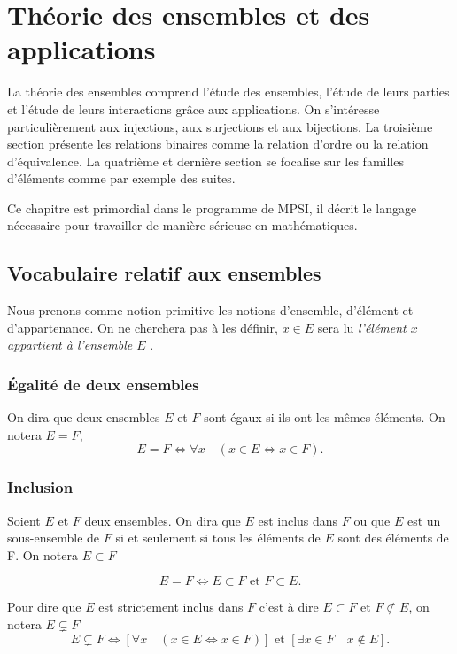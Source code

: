 \chapter{Théorie des ensembles et des applications}
\label{chap:ensembles}
\minitoc
\minilof
\minilot

La théorie des ensembles comprend l'étude des ensembles, l'étude de leurs parties et l'étude de leurs interactions grâce aux applications. On s'intéresse particulièrement aux injections, aux surjections et aux bijections. La troisième section présente les relations binaires comme la relation d'ordre ou la relation d'équivalence. La quatrième et dernière section se focalise sur les familles d'éléments comme par exemple des suites. 

Ce chapitre est primordial dans le programme de MPSI, il décrit le langage nécessaire pour travailler de manière sérieuse en mathématiques.
%
\section{Vocabulaire relatif aux ensembles}
\label{chap3-sec:vocabensemble}
Nous prenons comme notion primitive les notions d'ensemble, d'élément et d'appartenance. On ne cherchera pas à les définir, \og$x \in E$\fg{} sera lu \og \emph{l'élément $x$ appartient à l'ensemble $E$} \fg{}.
%
\subsection{Égalité de deux ensembles}
\label{chap3-subsec:egalitededeuxensembles}
\begin{defdef}
  On dira que deux ensembles $E$ et $F$ sont égaux si ils ont les mêmes éléments. On notera $E=F$,
  \begin{equation}
    E=F \iff \forall x \quad \left(x \in E \iff x \in F \right).
  \end{equation}
\end{defdef}
%
\subsection{Inclusion}
\label{chap3-subsec:inclusion}
\begin{defdef}
  Soient $E$ et $F$ deux ensembles. On dira que $E$ est inclus dans $F$ ou que $E$ est un sous-ensemble de $F$ si et seulement si tous les éléments de $E$ sont des éléments de F. On notera $E \subset F$
\end{defdef}
\begin{prop} 
  \begin{equation}
    E=F \iff E \subset F \textrm{~et~} F \subset E.
  \end{equation}
\end{prop}
Pour dire que $E$ est strictement inclus dans $F$ c'est à dire $E \subset F \textrm{~et~} F \not\subset E$, on notera $E \subsetneq F$
\begin{equation}
  E \subsetneq F \iff \left[\forall x \quad \left(x \in E \iff x \in F \right) \right] \textrm{~et~} \left[\exists x \in F \quad x \not\in E \right].
\end{equation}
%
